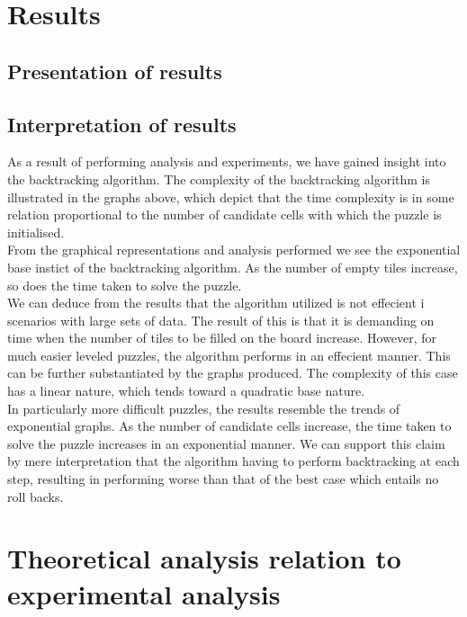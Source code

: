 \documentclass[12pt]{article}
\begin{document}
\section{Results}
\subsection{Presentation of results}
\subsection{Interpretation of results}
\begin{flushleft}
As a result of performing analysis and experiments, we have gained insight into the backtracking algorithm. The complexity of the backtracking algorithm is illustrated in the graphs above, which depict that the time complexity is in some relation proportional to the number of candidate cells with which the puzzle is initialised. 
\\
From the graphical representations and analysis performed we see the exponential base instict of the backtracking algorithm. As the number of empty tiles increase, so does the time taken to solve the puzzle. \\

We can deduce from the results that the algorithm utilized is not effecient i scenarios with large sets of data. The result of this is that it is demanding on time when the number of tiles to be filled on the board increase. However, for much easier leveled puzzles, the algorithm performs in an effecient manner. This can be further substantiated by the graphs produced. The complexity of this case has a linear nature, which tends toward a quadratic base nature. \\

In particularly more difficult puzzles, the results resemble the trends of exponential graphs. As the number of candidate cells increase, the time taken to solve the puzzle increases in an exponential manner. We can support this claim by mere interpretation that the algorithm having to perform backtracking at each step, resulting in performing worse than that of the best case which entails no roll backs. 
\end{flushleft}
\section{Theoretical analysis relation to experimental analysis}
\end{document}
